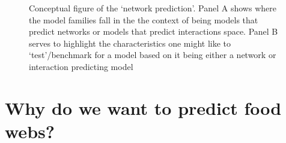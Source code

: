 \documentclass[
]{article}
\begin{document}
\begin{figure}


\caption{\label{fig-concept}Conceptual figure of the `network
prediction'. Panel A shows where the model families fall in the the
context of being models that predict networks or models that predict
interactions space. Panel B serves to highlight the characteristics one
might like to `test'/benchmark for a model based on it being either a
network or interaction predicting model}

\end{figure}%

\section{Why do we want to predict food webs?}\label{sec-network-why}
\end{document}
